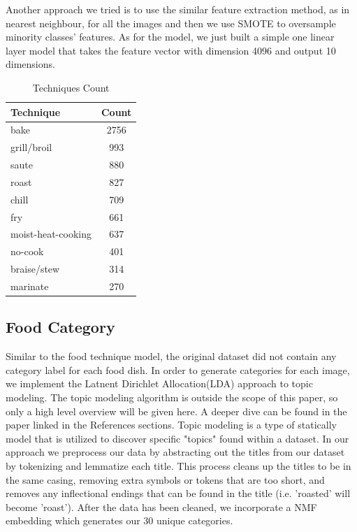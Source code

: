\documentclass[10pt,twocolumn,letterpaper]{article}
\begin{document}
Another approach we tried is to use the similar feature extraction method, as in nearest neighbour, for all the images and then we use SMOTE \cite{Authors02} to oversample minority classes’ features. As for the model, we just built a simple one linear layer model that takes the feature vector with dimension 4096 and output 10 dimensions.
\begin{table}
\begin{center}
\begin{tabular}{|l|c|}
\hline
Technique & Count \\
\hline\hline
bake & 2756 \\
grill/broil &  993 \\
saute &  880 \\
roast &  827 \\
chill &  709 \\
fry &  661 \\
moist-heat-cooking &  637 \\
no-cook &  401 \\
braise/stew &  314 \\
marinate &  270 \\
\hline
\end{tabular}
\end{center}
\caption{Techniques Count}
\label{tab:techniques_count}
\end{table}

\subsection{Food Category}
Similar to the food technique model, the original dataset did not contain any category label for each food dish. In order to generate categories for each image, we implement the Latnent Dirichlet Allocation(LDA) approach to topic modeling. The topic modeling algorithm is outside the scope of this paper, so only a high level overview will be given here\cite{Authors03}. A deeper dive can be found in the paper linked in the References sections. Topic modeling is a type of statically model that is utilized to discover specific "topics" found within a dataset. In our approach we preprocess our data by abstracting out the titles from our dataset by tokenizing and lemmatize each title. This process cleans up the titles to be in the same casing, removing extra symbols or tokens that are too short, and removes any inflectional endings that can be found in the title (i.e. 'roasted' will become 'roast'). After the data has been cleaned, we incorporate a NMF embedding which generates our 30 unique categories. 
\end{document}
